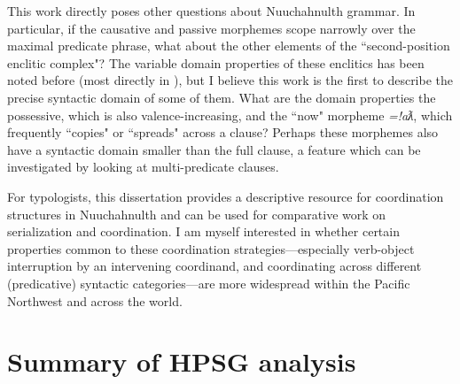 This work directly poses other questions about Nuuchahnulth grammar. In particular, if the causative and passive morphemes scope narrowly over the maximal predicate phrase, what about the other elements of the ``second-position enclitic complex"? The variable domain properties of these enclitics has been noted before (most directly in \citealt[p.~106--109,253--255]{davidson2002}), but I believe this work is the first to describe the precise syntactic domain of some of them. What are the domain properties the possessive, which is also valence-increasing, and the ``now" morpheme \textit{=!aƛ}, which frequently ``copies" or ``spreads" across a clause? Perhaps these morphemes also have a syntactic domain smaller than the full clause, a feature which can be investigated by looking at multi-predicate clauses. %


For typologists, this dissertation provides a descriptive resource for coordination structures in Nuuchahnulth and can be used for comparative work on serialization and coordination. I am myself interested in whether certain properties common to these coordination strategies---especially verb-object interruption by an intervening coordinand, and coordinating across different (predicative) syntactic categories---are more widespread within the Pacific Northwest and across the world.

\section{Summary of HPSG analysis}

